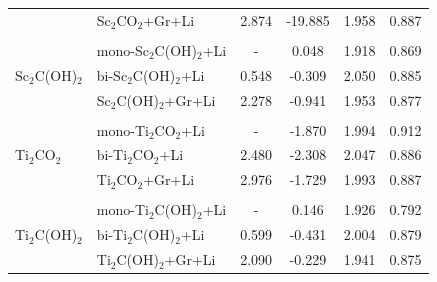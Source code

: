 \begin{table}[htbp]
{\begin{tabularx}{\textwidth}{llcccc}
              & Sc$_2$CO$_2$+Gr+Li     & 2.874              & -19.885 & 1.958  & 0.887 \\ 
              & & & & \\
\multirow{3}{*}{Sc$_2$C(OH)$_2$} &mono-Sc$_2$C(OH)$_2$+Li                                            & -                        & 0.048                          & 1.918                     & 0.869                        \\
              &bi-Sc$_2$C(OH)$_2$+Li                                              & 0.548                     & -0.309                         & 2.050                     & 0.885                        \\
              &Sc$_2$C(OH)$_2$+Gr+Li                                                   & 2.278                   & -0.941                         & 1.953                     & 0.877                        \\ 
              & & & & \\
\multirow{3}{*}{Ti$_2$CO$_2$}    &mono-Ti$_2$CO$_2$+Li                                            & -                         & -1.870                         & 1.994                     & 0.912                        \\
              &bi-Ti$_2$CO$_2$+Li                                                 & 2.480                   & -2.308                         & 2.047                     & 0.886                        \\
              &Ti$_2$CO$_2$+Gr+Li                                                   & 2.976                   & -1.729                         & 1.993                     & 0.887                        \\ 
              & & & & \\
\multirow{3}{*}{Ti$_2$C(OH)$_2$} &mono-Ti$_2$C(OH)$_2$+Li                                              & -                                     & 0.146                          & 1.926                     & 0.792                        \\
              &bi-Ti$_2$C(OH)$_2$+Li                                              & 0.599                   & -0.431                         & 2.004                     & 0.879                        \\
              &Ti$_2$C(OH)$_2$+Gr+Li                                                  & 2.090                   & -0.229                         & 1.941                     & 0.875                        \\ 

\end{tabularx}}
\end{table}
